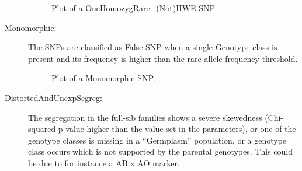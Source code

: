 \documentclass[a4paper,11pt,english]{article}
\begin{document}
\begin{description}
\begin{figure}[H]
\caption{Plot of a OneHomozygRare\_(Not)HWE SNP}\end{figure}

\item [Monomorphic:] The SNPs are classified as False-SNP when a single
Genotype  class is present  and its  frequency is higher than the rare allele
frequency threshold.
\begin{figure}[H]
\centering
\capstart

\caption{Plot of a Monomorphic SNP.}\end{figure}

\item [DistortedAndUnexpSegreg:] The segregation in the full-sib families shows a severe skewedness
(Chi-squared p-value higher than the value set in the parameters), or one of
the genotype classes is missing in a ``Germplasm'' population, or a genotype class occurs
which is not supported by the parental genotypes. This  could be due to for instance a AB x AO marker.
\begin{figure}[H]
\centering
\capstart


\end{figure}
\end{description}
\end{document}
